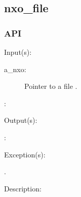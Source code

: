 %
%
%
%
%              

\subsection{nxo\_file}
\label{nxo_file}

\subsubsection{API}
\begin{capi}
\label{nxo_file_}
	\begin{capilist}
	\item[Input(s): ]
		\begin{description}\item[]
		\item[a\_nxo: ]
			Pointer to a file .
		\item[: ]
		\end{description}
	\item[Output(s): ]
		\begin{description}\item[]
		\item[: ]
		\end{description}
	\item[Exception(s): ]
		\begin{description}\item[]
		\item[.]
		\end{description}
	\item[Description: ]
	\end{capilist}
\end{capi}
